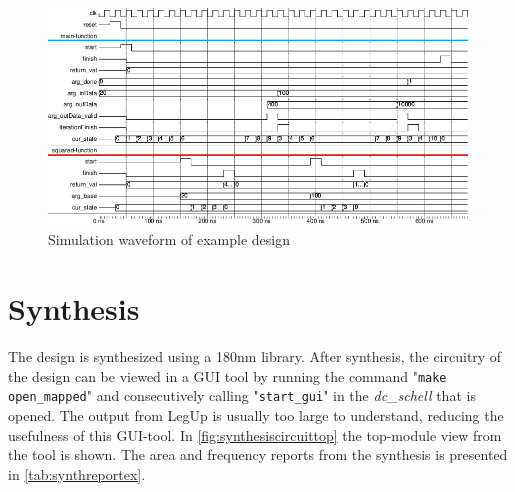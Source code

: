 \begin{figure}[hbpt]
\centering
\includegraphics[width=0.99\textwidth]{../figs/SimulationWaveEX.png}
\caption{\label{fig:simulationwave}Simulation waveform of example design}
\end{figure}
\section{Synthesis}
The design is synthesized using a 180nm library. After synthesis, the circuitry of the design can be viewed in a GUI tool by running the command "\verb!make open_mapped!" and consecutively calling "\verb!start_gui!" in the \textit{dc\_schell} that is opened. The output from LegUp is usually too large to understand, reducing the usefulness of this GUI-tool. In \cref{fig:synthesiscircuittop} the top-module view from the tool is shown. The area and frequency reports from the synthesis is presented in \cref{tab:synthreportex}.

